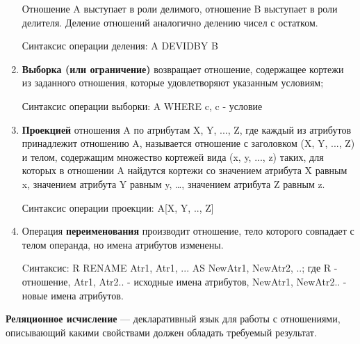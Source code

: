 \begin{enumerate}
Отношение A выступает в роли делимого, отношение B выступает в роли делителя. Деление отношений аналогично делению чисел с остатком.

Синтаксис операции деления: A DEVIDBY B


\item  \textbf{Выборка (или ограничение)} возвращает отношение, содержащее кортежи из заданного отношения, которые удовлетворяют указанным условиям;

Синтаксис операции выборки: A WHERE c, c - условие 

\item \textbf{Проекцией} отношения A по атрибутам X, Y, ..., Z, где каждый из атрибутов принадлежит отношению A, называется отношение с заголовком (X, Y, ..., Z)  и телом, содержащим множество кортежей вида (x, y, ..., z) таких, для которых в отношении A найдутся кортежи со значением атрибута X равным x, значением атрибута Y равным y, …, значением атрибута Z равным z. 

Синтаксис операции проекции: A[X, Y, .., Z]

\item Операция \textbf{переименования} производит отношение, тело которого совпадает с телом операнда, но имена атрибутов изменены. 

Cинтаксис: R RENAME Atr1, Atr1, ... AS NewAtr1, NewAtr2, ..; где R - отношение, Atr1, Atr2.. - исходные имена атрибутов, NewAtr1, NewAtr2.. - новые имена атрибутов.

\end{enumerate}

\textbf{Реляционное исчисление} — декларативный язык для работы с отношениями, описывающий какими свойствами должен обладать требуемый результат.

